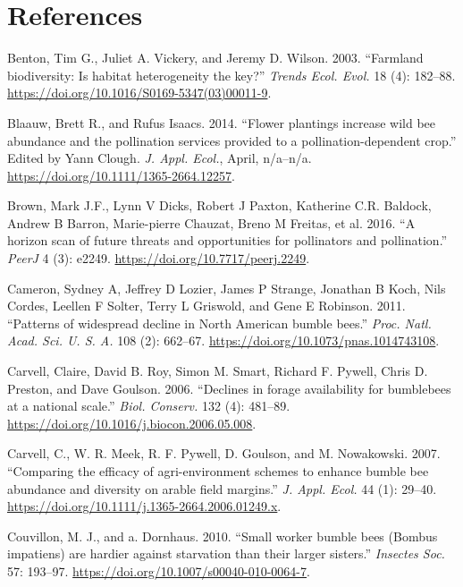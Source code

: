 \documentclass[11pt,]{article}
\begin{document}
\hypertarget{references}{%
\section*{References}\label{references}}

\hypertarget{refs}{}
\leavevmode\hypertarget{ref-Benton2003}{}%
Benton, Tim G., Juliet A. Vickery, and Jeremy D. Wilson. 2003.
``Farmland biodiversity: Is habitat heterogeneity the key?''
\emph{Trends Ecol. Evol.} 18 (4): 182--88.
\url{https://doi.org/10.1016/S0169-5347(03)00011-9}.

\leavevmode\hypertarget{ref-Blaauw2014}{}%
Blaauw, Brett R., and Rufus Isaacs. 2014. ``Flower plantings increase
wild bee abundance and the pollination services provided to a
pollination-dependent crop.'' Edited by Yann Clough. \emph{J. Appl.
Ecol.}, April, n/a--n/a. \url{https://doi.org/10.1111/1365-2664.12257}.

\leavevmode\hypertarget{ref-Brown2016a}{}%
Brown, Mark J.F., Lynn V Dicks, Robert J Paxton, Katherine C.R. Baldock,
Andrew B Barron, Marie-pierre Chauzat, Breno M Freitas, et al. 2016. ``A
horizon scan of future threats and opportunities for pollinators and
pollination.'' \emph{PeerJ} 4 (3): e2249.
\url{https://doi.org/10.7717/peerj.2249}.

\leavevmode\hypertarget{ref-Cameron2011}{}%
Cameron, Sydney A, Jeffrey D Lozier, James P Strange, Jonathan B Koch,
Nils Cordes, Leellen F Solter, Terry L Griswold, and Gene E Robinson.
2011. ``Patterns of widespread decline in North American bumble bees.''
\emph{Proc. Natl. Acad. Sci. U. S. A.} 108 (2): 662--67.
\url{https://doi.org/10.1073/pnas.1014743108}.

\leavevmode\hypertarget{ref-Carvell2006b}{}%
Carvell, Claire, David B. Roy, Simon M. Smart, Richard F. Pywell, Chris
D. Preston, and Dave Goulson. 2006. ``Declines in forage availability
for bumblebees at a national scale.'' \emph{Biol. Conserv.} 132 (4):
481--89. \url{https://doi.org/10.1016/j.biocon.2006.05.008}.

\leavevmode\hypertarget{ref-Carvell2007}{}%
Carvell, C., W. R. Meek, R. F. Pywell, D. Goulson, and M. Nowakowski.
2007. ``Comparing the efficacy of agri-environment schemes to enhance
bumble bee abundance and diversity on arable field margins.'' \emph{J.
Appl. Ecol.} 44 (1): 29--40.
\url{https://doi.org/10.1111/j.1365-2664.2006.01249.x}.

\leavevmode\hypertarget{ref-Couvillon2010}{}%
Couvillon, M. J., and a. Dornhaus. 2010. ``Small worker bumble bees
(Bombus impatiens) are hardier against starvation than their larger
sisters.'' \emph{Insectes Soc.} 57: 193--97.
\url{https://doi.org/10.1007/s00040-010-0064-7}.
\end{document}
